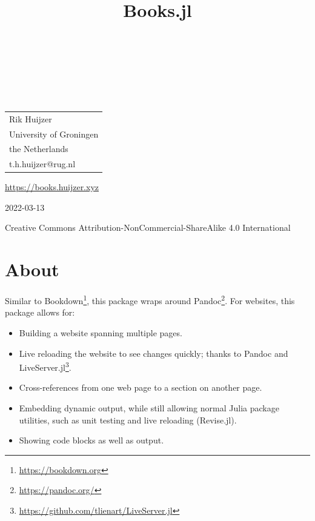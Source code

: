 \documentclass[
  notoc %
]{tufte-book}
\title{Books.jl}
\author{\noindent{Rik Huijzer}\\[3mm] \noindent{and
contributors}\\[3mm] }
\date{}
\DeclareRobustCommand{\href}[2]{#2\footnote{\url{#1}}}
\providecommand{\tightlist}{%
  \setlength{\itemsep}{0pt}\setlength{\parskip}{0pt}
}
\begin{document}
\makeatletter
\thispagestyle{empty}
\vfill
{\Huge\bf
\noindent
\@title
}\\[1in]
{\Large
\noindent
\@author
}
\makeatother

\makeatletter
\newpage
\thispagestyle{empty}
\vfill
{\noindent
\begin{tabular}{l} Rik Huijzer\\ University of Groningen\\ the Netherlands\\ t.h.huijzer@rug.nl\\ \end{tabular}
}
\vfill
{\small
\url{https://books.huijzer.xyz}

2022-03-13

Creative Commons Attribution-NonCommercial-ShareAlike 4.0 International
}
\makeatother


\frontmatter
\mainmatter

\setcounter{tocdepth}{1}
\tableofcontents

\justifying

\setlength{\parindent}{0pt}

\hypertarget{sec:about}{%
\chapter{About}\label{sec:about}}

Similar to \href{https://bookdown.org}{Bookdown}, this package wraps
around \href{https://pandoc.org/}{Pandoc}. For websites, this package
allows for:

\begin{itemize}
\tightlist
\item
  Building a website spanning multiple pages.
\item
  Live reloading the website to see changes quickly; thanks to Pandoc
  and \href{https://github.com/tlienart/LiveServer.jl}{LiveServer.jl}.
\item
  Cross-references from one web page to a section on another page.
\item
  Embedding dynamic output, while still allowing normal Julia package
  utilities, such as unit testing and live reloading (Revise.jl).
\item
  Showing code blocks as well as output.
\end{itemize}
\end{document}
